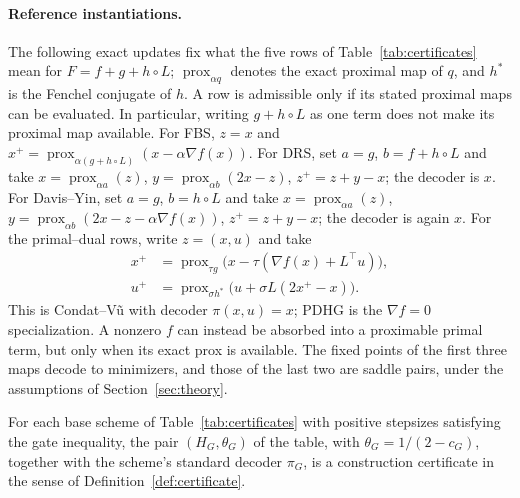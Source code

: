\paragraph{Reference instantiations.}
The following exact updates fix what the five rows of
Table~\ref{tab:certificates} mean for
$F=f+g+h\circ L$; $\operatorname{prox}_{\alpha q}$ denotes the exact
proximal map of $q$, and $h^*$ is the Fenchel conjugate of $h$. A row is
admissible only if its stated proximal maps can be evaluated. In particular,
writing $g+h\circ L$ as one term does not make its proximal map available.
For FBS, $z=x$ and
$x^+=\operatorname{prox}_{\alpha(g+h\circ L)}(x-\alpha\nabla f(x))$.
For DRS, set $a=g$, $b=f+h\circ L$ and take
$x=\operatorname{prox}_{\alpha a}(z)$,
$y=\operatorname{prox}_{\alpha b}(2x-z)$,
$z^+=z+y-x$; the decoder is $x$.
For Davis--Yin, set $a=g$, $b=h\circ L$ and take
$x=\operatorname{prox}_{\alpha a}(z)$,
$y=\operatorname{prox}_{\alpha b}(2x-z-\alpha\nabla f(x))$,
$z^+=z+y-x$; the decoder is again $x$.
For the primal--dual rows, write $z=(x,u)$ and take
\begin{align*}
 x^+&=\operatorname{prox}_{\tau g}
       \bigl(x-\tau(\nabla f(x)+L^\top u)\bigr),\\
 u^+&=\operatorname{prox}_{\sigma h^*}
       \bigl(u+\sigma L(2x^+-x)\bigr).
\end{align*}
This is Condat--V\~u with decoder $\pi(x,u)=x$; PDHG is the
$\nabla f=0$ specialization. A nonzero $f$ can instead be absorbed into
a proximable primal term, but only when its exact prox is available.
The fixed points of the first three maps decode to minimizers, and those
of the last two are saddle pairs, under the assumptions of
Section~\ref{sec:theory}.

\begin{lemma}
\label{lem:base-certificates}
For each base scheme of Table~\ref{tab:certificates} with positive stepsizes
satisfying the gate inequality, the pair $(H_G,\theta_G)$ of the table, with
$\theta_G=1/(2-c_G)$, together with the scheme's standard decoder $\pi_G$,
is a construction certificate in the sense of
Definition~\ref{def:certificate}.
\end{lemma}

